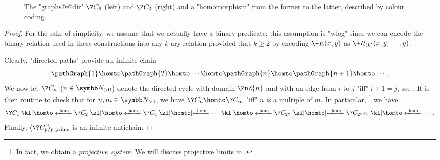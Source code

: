 \begin{figure}
	\centering
	\caption{\AP\label{fig:prelim-db-cycles} The "graphs@@dir" $\?C_6$
	(left) and $\?C_3$ (right) and a "homomorphism" from the former
	to the latter, described by colour coding.}
\end{figure}
\begin{proof}
	For the sake of simplicity, we assume that we actually have
	a binary predicate: this assumption is "wlog" since we can encode the binary 
	relation used in these constructions into any $k$-ary
	relation provided that $k \geq 2$ by encoding $\+E(x,y)$
	as $\+R_{(k)}(x,y,\dotsc,y)$.

	Clearly, "directed paths" provide an infinite chain
	\[
		\pathGraph{1} \homto \pathGraph{2} \homto \cdots
			\homto \pathGraph{n} \homto \pathGraph{n+1} \homto \cdots.
	\]
	We now let $\?C_n$ ($n\in\Np$) denote the directed cycle with domain $\ZnZ{n}$
	and with an edge from $i$ to $j$ "iff" $i+1 = j$, see .
	It is then routine to check that for $n,m\in\Np$, we have $\?C_n \homto \?C_m$
	"iff" $n$ is a multiple of $m$. In particular,%
	\footnote{In fact, we obtain a \emph{projective system}. We will discuss
	projective limits in .}
	we have
	\[
		\?C_1 \cohomto \?C_2 \cohomto \?C_4 \cohomto \cdots \cohomto \?C_{2^n} \cohomto \?C_{2^{n+1}} \cohomto \cdots.
	\]
	Finally, $\tup{\?C_p}_{p \text{ prime}}$ is an infinite antichain.
\end{proof}

